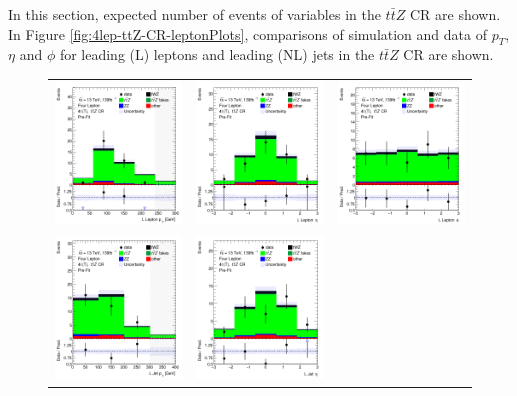 In this section, expected number of events of variables in the $t\bar{t}Z$ CR are shown. In Figure \ref{fig:4lep-ttZ-CR-leptonPlots}, comparisons of simulation and data of $p_{T}$, $\eta$ and $\phi$ for leading (L) leptons and leading (NL) jets in the $t\bar{t}Z$ CR are shown.
\begin{figure}[htbp]
\centering
  \begin{tabular}{ccc}


    \includegraphics[width=.25\textwidth]{figures/PreFitPlots/lep4_ttZ_4T_L_lepton_pt.png} &
    \includegraphics[width=.25\textwidth]{figures/PreFitPlots/lep4_ttZ_4T_L_lepton_eta.png} &
    \includegraphics[width=.25\textwidth]{figures/PreFitPlots/lep4_ttZ_4T_L_lepton_phi.png} \\
    \includegraphics[width=.25\textwidth]{figures/PreFitPlots/lep4_ttZ_4T_LJet_pt.png} &
    \includegraphics[width=.25\textwidth]{figures/PreFitPlots/lep4_ttZ_4T_LJet_eta.png} &

\end{tabular}
\end{figure}
